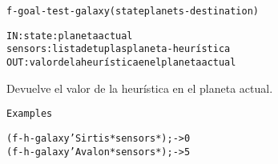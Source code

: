 \begin{aibox}{\function}
\begin{alltt}
f-goal-test-galaxy (state planets-destination) 


IN: 	state: planeta actual
		sensors: lista de tuplas planeta-heurística
OUT: valor de la heurística en el planeta actual

\end{alltt}
\end{aibox}

\begin{aibox}{\examples}
\begin{alltt}

\end{alltt}
\end{aibox}

\begin{aibox}{\comments}
Devuelve el valor de la heurística en el planeta actual.

\end{aibox}

\begin{aibox}{\pseudocode}
\begin{alltt}
Examples

\end{alltt}
\end{aibox}

\begin{aibox}{\code}
\begin{alltt}
(f-h-galaxy 'Sirtis *sensors*) ;-> 0
(f-h-galaxy 'Avalon *sensors*) ;-> 5




\end{alltt}
\end{aibox}
